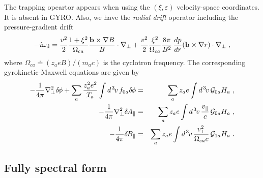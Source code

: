 \documentclass[11pt]{article}
\begin{document}
%
The trapping opeartor appears when using the $(\xi,\varepsilon)$ velocity-space 
coordinates.  It is absent in GYRO.  Also, we have the {\sl radial drift} operator 
including the pressure-gradient drift
%
\begin{equation}
- i \omega_{\rm d} = \frac{v^2}{2} \frac{1 + \xi^2}{\Omega_{ca}} 
  \frac{{\bf b} \times \nabla B}{B} \cdot \nabla_\perp 
  + \frac{v^2}{2} \frac{\xi^2}{\Omega_{ca}} \frac{8\pi}{B^2} \, \frac{dp}{dr} 
  ({\bf b} \times \nabla r) \cdot \nabla_\perp \; ,
\end{equation}
%  
where $\Omega_{ca} \doteq (z_a e B)/(m_a c)$ is the cyclotron frequency.
The corresponding gyrokinetic-Maxwell equations are given by
%
\begin{eqnarray}
-\frac{1}{4 \pi} \nabla_{\perp}^{2} \delta \hskip -1pt \phi + \sum_a
 \frac{z_a^2 e^2}{T_a} \int d^{\hskip 1pt 3} \hskip -1pt v \, f_{0a} \delta \hskip -1pt \phi
&=& \sum_{a} z_a e \int d^{\hskip 1pt 3} \hskip -1pt v \, {\cal G}_{0a} H_a \; ,
 \label{gk_phi} \\
 -\frac{1}{4 \pi} \nabla_{\perp}^{2} \delta \hskip -1pt A_\parallel
&=& \sum_{a} z_a e \int d^{\hskip 1pt 3} \hskip -1pt v \, \frac{v_\parallel}{c} \, {\cal G}_{0a} H_{a} \; ,
\label{gk_apar}  \\
-\frac{1}{4 \pi} \delta \hskip -1pt B_\parallel
&=& \sum_{a} z_a e  \int d^{\hskip 1pt 3} \hskip -1pt v \,
 \frac{v_{\perp}^{2}}{\Omega_{ca} c} \, {\cal G}_{1a} H_{a} \; .
\label{gk_bpar}
\end{eqnarray}

\subsection{Fully spectral form}
\end{document}
